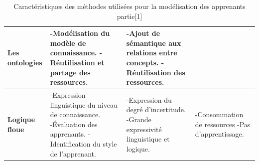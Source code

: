 \begin{table}[H]
\begin{tabular}{|m{3cm}|m{5cm}|m{5cm}|m{4cm}|}
	  \textbf{Les ontologies}  &
	  -Modélisation du modèle de connaissance. \newline
	  -Réutilisation et partage des ressources.&
	  -Ajout de sémantique aux relations entre concepts. \newline
	  -Réutilisation des ressources.&  \\ \hline
	  \textbf{Logique floue}  &
	  -Expression linguistique du niveau de connaissance. \newline
	  -Évaluation des apprenants.\newline
	  -Identification du style de l'apprenant.&
	  -Expression du degré d'incertitude. \newline
	  -Grande expressivité linguistique et logique.&
	  -Consommation de ressources \newline
	  -Pas d'apprentissage. \\ \hline
	\end{tabular}
	\caption{Caractéristiques des méthodes utilisées pour la modélisation des apprenants partie[1]}
	\label{Caracteristiques_modelisation_apprenants1}
\end{table}

